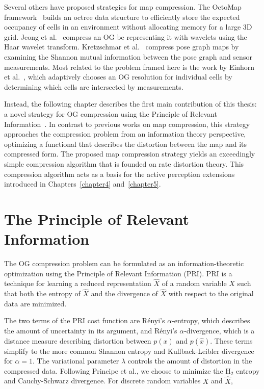 Several others have proposed strategies for map compression. The OctoMap
framework~\cite{wurm2010octomap} builds an octree data structure to efficiently store the
expected occupancy of cells in an environment without allocating memory for a
large 3D grid. Jeong et al.~\cite{im2010real} compress an OG be representing it with
wavelets using the Haar wavelet transform. Kretzschmar et
al.~\cite{kretzschmar2012information} compress
pose graph maps by examining the Shannon mutual information between the pose
graph and sensor measurements. Most related to the problem framed here is the
work by Einhorn et al.~\cite{einhorn2011finding}, which adaptively chooses an OG resolution for
individual cells by determining which cells are intersected by measurements.

Instead, the following chapter describes the first main contribution of this
thesis: a novel strategy for OG compression using the Principle of Relevant
Information~\cite{principe2010information}. In contrast to previous works on map
compression, this strategy approaches the compression problem from an information theory
perspective, optimizing a functional that describes the distortion between the
map and its compressed form. The proposed map compression strategy yields an
exceedingly simple compression algorithm that is founded on rate
distortion theory. This compression algorithm acts as a basis for the
active perception extensions introduced in Chapters~\ref{chapter4} and~\ref{chapter5}.

\section{The Principle of Relevant Information}

The OG compression problem can be formulated as an information-theoretic optimization
using the Principle of Relevant Information (PRI). PRI is a technique for learning a
reduced representation $\hat{X}$ of a random variable $X$ such that both the entropy of
$\hat{X}$ and the divergence of $\hat{X}$ with respect to the original data are minimized.
%

The two terms of the PRI cost function are R\'{e}nyi's $\alpha$-entropy, which describes
the amount of uncertainty in its argument, and R\'{e}nyi's $\alpha$-divergence, which is a
distance measure describing distortion between $p(x)$ and $p(\hat{x})$. These terms simplify
to the more common Shannon entropy and Kullback-Leibler divergence for $\alpha = 1$. The
variational parameter $\lambda$ controls the amount of distortion in the compressed data.
Following Principe et al., we choose to minimize the $\text{H}_{2}$ entropy and
Cauchy-Schwarz divergence. For discrete random variables $X$ and $\hat{X}$,
%

